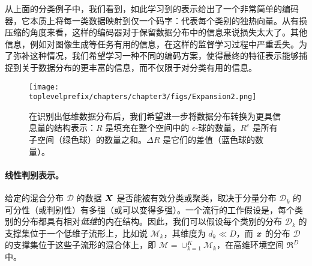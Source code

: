 \documentclass[../../book-main.tex]{subfiles}
\begin{document}
从上面的分类例子中，我们看到，如此学习到的表示给出了一个非常简单的编码器，它本质上将每一类数据映射到仅一个码字：代表每个类别的独热向量。从有损压缩的角度来看，这样的编码器对于保留数据分布中的信息来说损失太大了。其他信息，例如对图像生成等任务有用的信息，在这样的监督学习过程中严重丢失。为了弥补这种情况，我们希望学习一种不同的编码方案，使得最终的特征表示能够捕捉到关于数据分布的更丰富的信息，而不仅限于对分类有用的信息。



\begin{figure}[ht]
	\centering
	\texttt{[image: \\toplevelprefix/chapters/chapter3/figs/Expansion2.png]}
	\caption{在识别出低维数据分布后，我们希望进一步将数据分布转换为更具信息量的结构表示：$R$ 是填充在整个空间中的 $\epsilon$-球的数量，$R^c$ 是所有子空间（绿色球）的数量之和。$\Delta R$ 是它们的差值（蓝色球的数量）。}\label{fig:sphere-packing}
	\label{fig:informative-representation}
\end{figure}


\paragraph{线性判别表示。}
给定的混合分布 $\mathcal{D}$ 的数据 $\bm{X}$ 是否能被有效分类或聚类，取决于分量分布 $\mathcal{D}_k$ 的可分性（或判别性）有多强（或可以变得多强）。一个流行的工作假设是，每个类别的分布都具有相对{\em 低维}的内在结构。因此，我们可以假设每个类别的分布 $\mathcal{D}_k$ 的支撑集位于一个低维子流形上，比如说 $\mathcal{M}_k$，其维度为 $d_k \ll D$，而 $\bm{x}$ 的分布 $\mathcal D$ 的支撑集位于这些子流形的混合体上，即 $\mathcal M = \cup_{k=1}^K \mathcal{M}_k$，在高维环境空间 $\Re^D$ 中。
\end{document}
